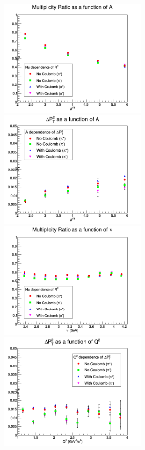 \begin{figure}[tbp]
\centering
\includegraphics[width=7.4cm] {new-fig/50_Adep_Ratio_A13_2.png} 
\includegraphics[width=7.4cm] {new-fig/54_Adep_DePts_A13_2.png} 
\includegraphics[width=7.4cm] {new-fig/51_Ndep_Ratio_Nu_2.png} 
\includegraphics[width=7.4cm] {new-fig/56_Qdep_DePts_Q2_2.png} 

\end{figure}
